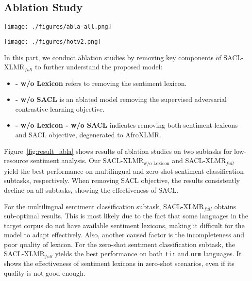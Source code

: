 \documentclass[11pt]{article}
\begin{document}
\subsection{Ablation Study}

\begin{figure*}[t]
    \centering
    \texttt{[image: ./figures/abla-all.png]}
    \caption{Ablation study results on two subtasks. We report the weighted-F1 score.     }
    \label{fig:result_abla}
\end{figure*}


\begin{figure*}[t]
\centering
\texttt{[image: ./figures/hotv2.png]}
\caption{The normalized confusion matrices for SACL-XLMR on three test sets of AfriSenti.
The rows represent the actual sentiment labels, whereas the columns represent predictions made by the model. 
Each cell $(i,j)$ represents that the percentage of class $i$ was predicted as class $j$.
The values of the diagonal elements represent the degree of correctly predicted classes. 
The higher the diagonal values of the confusion matrix the better, indicating many correct predictions.    
}
    \label{fig:error}
\end{figure*}

In this part, we conduct ablation studies by removing key components of SACL-XLMR$_{full}$ to further understand the proposed model:
\begin{itemize}
    \item  \textbf{- w/o Lexicon} refers to removing the sentiment lexicon.
    \item  \textbf{- w/o SACL} is an ablated model removing the supervised adversarial contrastive learning objective.
    \item  \textbf{- w/o Lexicon - w/o SACL} indicates removing both sentiment lexicons and SACL objective, degenerated to AfroXLMR.
\end{itemize}


Figure~\ref{fig:result_abla} shows results of ablation studies on two subtasks for low-resource sentiment analysis. 
Our SACL-XLMR$_{\text{w/o Lexicon}}$ and
SACL-XLMR$_{full}$  yield
the best performance on multilingual and zero-shot sentiment classification subtasks, respectively. When removing SACL objective, the results consistently decline on all subtasks, showing the effectiveness of SACL.

For the multilingual sentiment classification subtask, SACL-XLMR$_{full}$ obtains sub-optimal  results. This is most likely due to the fact that some languages in the target corpus do not have available sentiment lexicons, making it difficult for the model to adapt effectively.
Also, another caused factor is the incompleteness and poor quality of lexicon.
For the zero-shot sentiment classification subtask, the SACL-XLMR$_{full}$ yields the best performance on both \texttt{tir} and \texttt{orm} languages. 
It shows the effectiveness of sentiment lexicons in zero-shot scenarios, even if its quality is not good enough.
\end{document}

